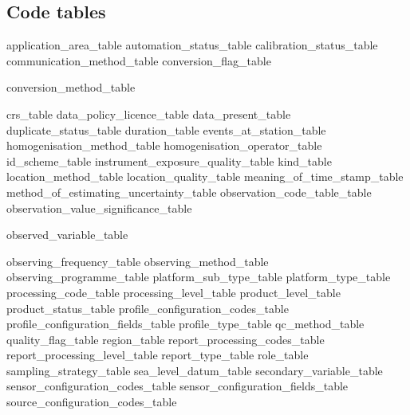 \documentclass[a4paper,12pt]{article}
\begin{document}
\subsection {Code tables}
 {application_area_table} %
 {automation_status_table} %
 {calibration_status_table} %
 {communication_method_table} %
 {conversion_flag_table} %
\begin{landscape}
 {conversion_method_table} %
\end{landscape}
 {crs_table} %
 {data_policy_licence_table} %
 {data_present_table} %
 {duplicate_status_table} %
 {duration_table} %
 {events_at_station_table} %
 {homogenisation_method_table}
 {homogenisation_operator_table}
 {id_scheme_table} %
 {instrument_exposure_quality_table} %
 {kind_table} %
 {location_method_table} %
 {location_quality_table} %
 {meaning_of_time_stamp_table} %
 {method_of_estimating_uncertainty_table} %
 {observation_code_table_table} %
 {observation_value_significance_table} %
\begin{landscape}
 {observed_variable_table} %
\end{landscape}
 {observing_frequency_table} %
 {observing_method_table} %
 {observing_programme_table} %
 {platform_sub_type_table} %
 {platform_type_table} %
 {processing_code_table} %
 {processing_level_table} %
 {product_level_table} %
 {product_status_table} %
 {profile_configuration_codes_table}
 {profile_configuration_fields_table}
 {profile_type_table} %
 {qc_method_table}
 {quality_flag_table} %
 {region_table} %
 {report_processing_codes_table} %
 {report_processing_level_table} %
 {report_type_table} %
 {role_table} %
 {sampling_strategy_table} %
 {sea_level_datum_table} %
 {secondary_variable_table} %
 {sensor_configuration_codes_table} %
 {sensor_configuration_fields_table} %
 {source_configuration_codes_table} %
\end{document}
